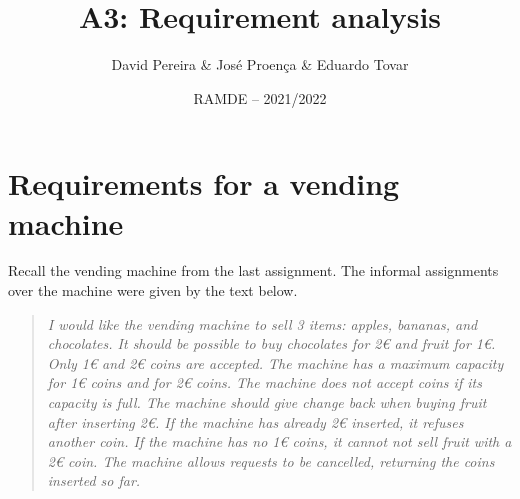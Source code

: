 \documentclass[11pt]{article}
\date{RAMDE -- 2021/2022}
\begin{document}
 
 
\title{A3: Requirement analysis}

\author{David Pereira \& Jos\'{e} Proen\c{c}a \& Eduardo Tovar} 


\maketitle







\section*{Requirements for a vending machine}


\begin{myExercise} \label{ex:vm}
Recall the vending machine from the last assignment.
The informal assignments over the machine were given by the text below.

\begin{quote}\it
  I would like the vending machine to sell 3 items: apples, bananas, and chocolates.
  It should be possible to buy chocolates for 2€ and fruit for 1€.
  Only 1€ and 2€ coins are accepted.
  The machine has a maximum capacity for 1€ coins and for 2€ coins. 
  The machine does not accept coins if its capacity is full.
  The machine should give change back when buying fruit after inserting 2€.
  If the machine has already 2€ inserted, it refuses another coin.
  If the machine has no 1€ coins, it cannot not sell fruit with a 2€ coin. 
  The machine allows requests to be cancelled, returning the coins inserted so far.
\end{quote}




\end{myExercise}
\end{document}
